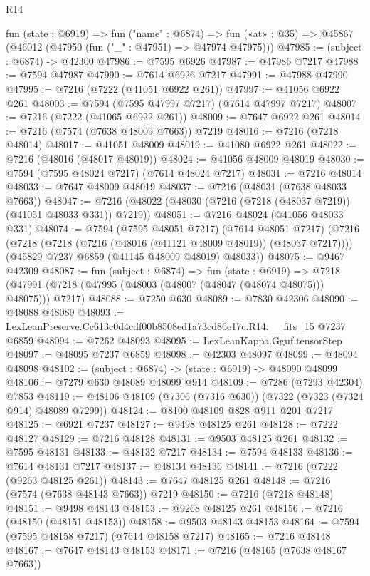 \begin{lexlean}{R14}
\begin{coremodule}
  fun (state : @6919) =>
  fun ("name" : @6874) =>
  fun («at» : @35) => @45867 (@46012 (@47950 (fun ("_" : @47951) => @47974 @47975)))
@47985 := (subject : @6874) -> @42300
@47986 := @7595 @6926
@47987 := @47986 @7217
@47988 := @7594 @47987
@47990 := @7614 @6926 @7217
@47991 := @47988 @47990
@47995 := @7216 (@7222 (@41051 @6922 @261))
@47997 := @41056 @6922 @261
@48003 := @7594 (@7595 @47997 @7217) (@7614 @47997 @7217)
@48007 := @7216 (@7222 (@41065 @6922 @261))
@48009 := @7647 @6922 @261
@48014 := @7216 (@7574 (@7638 @48009 @7663)) @7219
@48016 := @7216 (@7218 @48014)
@48017 := @41051 @48009
@48019 := @41080 @6922 @261
@48022 := @7216 (@48016 (@48017 @48019))
@48024 := @41056 @48009 @48019
@48030 := @7594 (@7595 @48024 @7217) (@7614 @48024 @7217)
@48031 := @7216 @48014
@48033 := @7647 @48009 @48019
@48037 := @7216 (@48031 (@7638 @48033 @7663))
@48047 := @7216 (@48022 (@48030 (@7216 (@7218 (@48037 @7219)) (@41051 @48033 @331)) @7219))
@48051 := @7216 @48024 (@41056 @48033 @331)
@48074 := @7594
    (@7595 @48051 @7217)
    (@7614 @48051 @7217)
    (@7216
      (@7218 (@7218 (@7216 (@48016 (@41121 @48009 @48019)) (@48037 @7217))))
      (@45829 @7237 @6859 (@41145 @48009 @48019) @48033))
@48075 := @9467 @42309
@48087 := fun (subject : @6874) =>
  fun (state : @6919) =>
  @7218 (@47991 (@7218 (@47995 (@48003 (@48007 (@48047 (@48074 @48075))) @48075))) @7217)
@48088 := @7250 @630
@48089 := @7830 @42306
@48090 := @48088 @48089
@48093 := LexLeanPreserve.Cc613c0d4cdf00b8508ed1a73cd86e17c.R14.__fits_15 @7237 @6859
@48094 := @7262 @48093
@48095 := LexLeanKappa.Gguf.tensorStep
@48097 := @48095 @7237 @6859
@48098 := @42303 @48097
@48099 := @48094 @48098
@48102 := (subject : @6874) -> (state : @6919) -> @48090 @48099
@48106 := @7279 @630 @48089 @48099 @914
@48109 := @7286 (@7293 @42304) @7853
@48119 := @48106 @48109 (@7306 (@7316 @630)) (@7322 (@7323 (@7324 @914) @48089 @7299))
@48124 := @8100 @48109 @828 @911 @201 @7217
@48125 := @6921 @7237
@48127 := @9498 @48125 @261
@48128 := @7222 @48127
@48129 := @7216 @48128
@48131 := @9503 @48125 @261
@48132 := @7595 @48131
@48133 := @48132 @7217
@48134 := @7594 @48133
@48136 := @7614 @48131 @7217
@48137 := @48134 @48136
@48141 := @7216 (@7222 (@9263 @48125 @261))
@48143 := @7647 @48125 @261
@48148 := @7216 (@7574 (@7638 @48143 @7663)) @7219
@48150 := @7216 (@7218 @48148)
@48151 := @9498 @48143
@48153 := @9268 @48125 @261
@48156 := @7216 (@48150 (@48151 @48153))
@48158 := @9503 @48143 @48153
@48164 := @7594 (@7595 @48158 @7217) (@7614 @48158 @7217)
@48165 := @7216 @48148
@48167 := @7647 @48143 @48153
@48171 := @7216 (@48165 (@7638 @48167 @7663))

\end{coremodule}
\end{lexlean}
